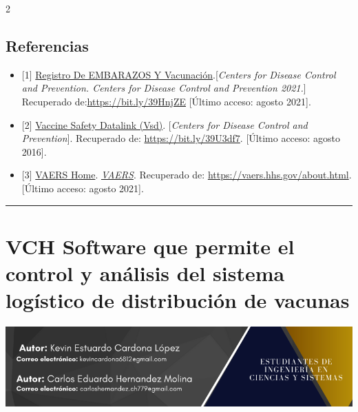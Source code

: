 \documentclass[12pt,spanish,Letterpaper,openany]{book}
\newcommand{\HRule}{\begin{center}\rule{0.5\linewidth}{0.2mm}\end{center}}
\begin{document}
\begin {multicols}{2}
\hypertarget{referencias-1}{%
\section{Referencias}\label{referencias-1}}

\begin{itemize}
\item
  {[}1{]} \href{http://humanidades.usac.edu.gt/portal/}{Registro De EMBARAZOS Y Vacunación}.{[}\emph{Centers for Disease Control and Prevention. Centers for Disease Control and Prevention 2021.}{]} Recuperado de:\url{https://bit.ly/39HnjZE} {[}Último acceso: agosto 2021{]}.
\item
  {[}2{]} \href{https://www.cdc.gov}{Vaccine Safety Datalink (Vsd)}. {[}\emph{Centers for Disease Control and Prevention}{]}. Recuperado de: \url{https://bit.ly/39U3df7}. {[}Último acceso: agosto 2016{]}.
\item
  {[}3{]} \href{http://humanidades.usac.edu.gt/portal/}{VAERS Home}. \href{http://humanidades.usac.edu.gt/portal/}{\emph{VAERS}}. Recuperado de: \url{https://vaers.hhs.gov/about.html}. {[}Último acceso: agosto 2021{]}.
\end{itemize}

\end {multicols}

\medskip

\HRule

\medskip

\hypertarget{pareja72}{%
\chapter{VCH Software que permite el control y análisis del sistema logístico de distribución de vacunas}\label{pareja72}}

\begin{center}\includegraphics[width=1\linewidth]{images/pareja72_01} \end{center}
\end{document}
